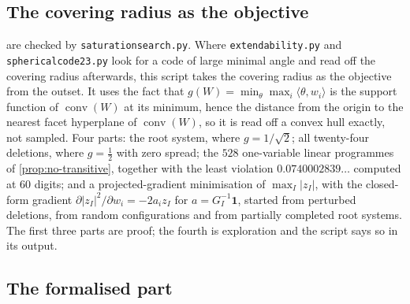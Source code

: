 \documentclass[11pt,reqno]{amsart}
\renewcommand{\_}{\origunderscore\allowbreak}
\numberwithin{equation}{section}
\theoremstyle{plain}
\theoremstyle{definition}
\theoremstyle{remark}
\DeclareMathOperator{\conv}{conv}
\begin{document}
\subsection*{The covering radius as the objective}

 are checked by
\texttt{saturation\_search.py}. Where \texttt{extendability.py} and
\texttt{spherical\_code\_23.py} look for a code of large minimal angle
and read off the covering radius afterwards, this script takes the
covering radius as the objective from the outset. It uses the fact that
$g(W)=\min_\theta\max_i\langle\theta,w_i\rangle$ is the support function
of $\conv(W)$ at its minimum, hence the distance from the origin to the
nearest facet hyperplane of $\conv(W)$, so it is read off a convex hull exactly, not sampled. Four parts: the root system, where
$g=1/\sqrt2$; all twenty-four deletions, where $g=\tfrac12$ with zero
spread; the $528$ one-variable linear programmes of
\cref{prop:no-transitive}, together with the least violation
$0.0740002839\ldots$ computed at $60$ digits; and a projected-gradient
minimisation of $\max_I|z_I|$, with the closed-form gradient
$\partial|z_I|^2/\partial w_i=-2a_iz_I$ for $a=G_I^{-1}\mathbf1$, started
from perturbed deletions, from random configurations and from partially
completed root systems. The first three parts are proof; the fourth is
exploration and the script says so in its output.

\subsection*{The formalised part}
\end{document}
